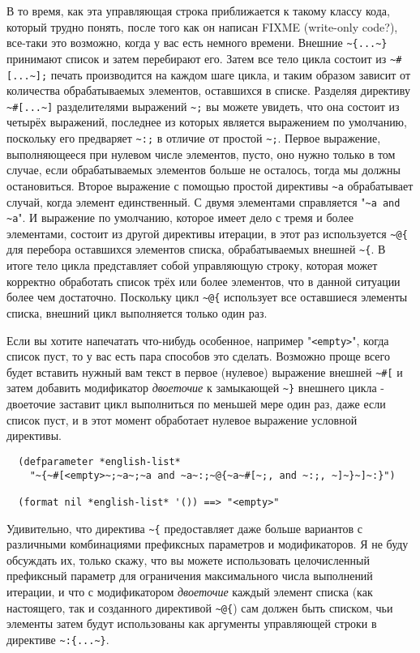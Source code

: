 В то время, как эта управляющая строка приближается к такому классу кода, который трудно понять, после того как
он написан FIXME (write-only code?), все-таки это возможно, когда у вас есть немного времени. Внешние
\lstinline!~{...~}! принимают список и затем перебирают его. Затем все тело цикла состоит из \lstinline!~#[...~];! печать
производится на каждом шаге цикла, и таким образом зависит от количества обрабатываемых элементов, оставшихся в
списке. Разделяя директиву \lstinline!~#[...~]! разделителями выражений \lstinline!~;! вы можете увидеть, что она состоит из
четырёх выражений, последнее из которых является выражением по умолчанию, поскольку его предваряет \lstinline!~:;! в
отличие от простой \lstinline!~;!. Первое выражение, выполняющееся при нулевом числе элементов, пусто, оно нужно только
в том случае, если обрабатываемых элементов больше не осталось, тогда мы должны остановиться. Второе выражение с
помощью простой директивы \lstinline!~a! обрабатывает случай, когда элемент единственный. С двумя элементами справляется
"\lstinline!~a and ~a!". И выражение по умолчанию, которое имеет дело с тремя и более элементами, состоит из другой
директивы итерации, в этот раз используется \lstinline!~@{! для перебора оставшихся элементов списка, обрабатываемых внешней
\lstinline!~{!. В итоге тело цикла представляет собой управляющую строку, которая может корректно обработать список трёх
или более элементов, что в данной ситуации более чем достаточно. Поскольку цикл \lstinline!~@{! использует все
оставшиеся элементы списка, внешний цикл выполняется только один раз.

Если вы хотите напечатать что-нибудь особенное, например "\lstinline!<empty>!", когда
список пуст, то у вас есть пара способов это сделать. Возможно проще всего будет вставить
нужный вам текст в первое (нулевое) выражение внешней \lstinline!~#[! и затем добавить
модификатор \textit{двоеточие} к замыкающей \lstinline!~}! внешнего цикла - двоеточие
заставит цикл выполниться по меньшей мере один раз, даже если список пуст, и в этот момент
 обработает нулевое выражение условной директивы.

\begin{verbatim}
  (defparameter *english-list*
    "~{~#[<empty>~;~a~;~a and ~a~:;~@{~a~#[~;, and ~:;, ~]~}~]~:}")

  (format nil *english-list* '()) ==> "<empty>"
\end{verbatim}

Удивительно, что директива \lstinline!~{! предоставляет даже больше вариантов с различными комбинациями префиксных
параметров и модификаторов. Я не буду обсуждать их, только скажу, что вы можете использовать целочисленный
префиксный параметр для ограничения максимального числа выполнений итерации, и что с модификатором \textit{двоеточие}
каждый элемент списка (как настоящего, так и созданного директивой \lstinline!~@{!) сам должен быть списком, чьи
элементы затем будут использованы как аргументы управляющей строки в директиве \lstinline!~:{...~}!.

